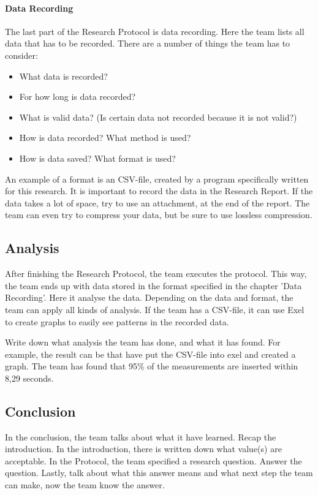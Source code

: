 \documentclass[10pt]{report}
\begin{document}
\paragraph{Data Recording}

The last part of the Research Protocol is data recording. Here the team lists all data that has to be recorded. There are a number of things the team has to consider:

\begin{itemize}
	\item What data is recorded?
	\item For how long is data recorded?
	\item What is valid data? (Is certain data not recorded because it is not valid?)
	\item How is data recorded? What method is used?
	\item How is data saved? What format is used?
\end{itemize}

\noindent An example of a format is an CSV-file, created by a program specifically written for this research. It is important to record the data in the Research Report. If the data takes a lot of space, try to use an attachment, at the end of the report. The team can even try to compress your data, but be sure to use lossless compression.

\subsection{Analysis}

After finishing the Research Protocol, the team executes the protocol. This way, the team ends up with data stored in the format specified in the chapter 'Data Recording'. Here it analyse the data. Depending on the data and format, the team can apply all kinds of analysis. If the team has a CSV-file, it can use Exel to create graphs to easily see patterns in the recorded data.

Write down what analysis the team has done, and what it has found. For example, the result can be that have put the CSV-file into exel and created a graph. The team has found that 95\% of the measurements are inserted within 8,29 seconds.

\subsection{Conclusion}

In the conclusion, the team talks about what it have learned. Recap the introduction. In the introduction, there is written down what value(s) are acceptable. In the Protocol, the team specified a research question. Answer the question. Lastly, talk about what this answer means and what next step the team can make, now the team know the answer.
\end{document}
